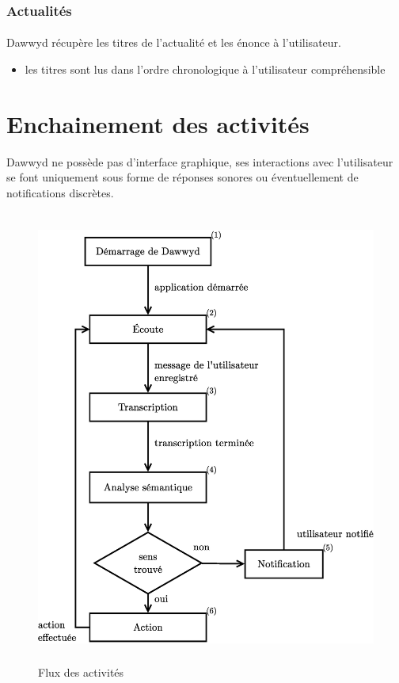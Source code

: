 \documentclass[12pt]{article}
\begin{document}
    \subsubsection{Actualités}
    \paragraph{}
    Dawwyd récupère les titres de l'actualité et les énonce à l'utilisateur.

    \begin{itemize}
        \item les titres sont lus dans l'ordre chronologique à l'utilisateur
            compréhensible
    \end{itemize}


    \section{Enchainement des activités}

    Dawwyd ne possède pas d'interface graphique, ses interactions avec
    l'utilisateur se font uniquement sous forme de réponses sonores
    ou éventuellement de notifications discrètes.

    \begin{figure}
        \centering
        \includegraphics[height=15cm]{diagramme_flux.eps}
        \caption{Flux des activités}
    \end{figure}
\end{document}
